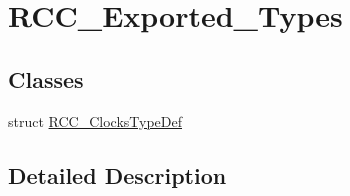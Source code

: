 \hypertarget{group___r_c_c___exported___types}{}\section{R\+C\+C\+\_\+\+Exported\+\_\+\+Types}
\label{group___r_c_c___exported___types}
\subsection*{Classes}
\begin{DoxyCompactItemize}
\item 
struct \hyperlink{struct_r_c_c___clocks_type_def}{R\+C\+C\+\_\+\+Clocks\+Type\+Def}
\end{DoxyCompactItemize}


\subsection{Detailed Description}

